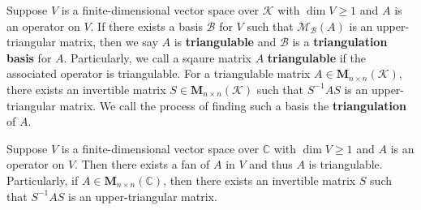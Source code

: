 \documentclass{ctexart}
\newcommand{\M}{\mathbf{M}}
\newcommand{\C}{\mathbb{C}}
\begin{document}
    \begin{mydef}
        Suppose $V$ is a finite-dimensional vector space over $\mathcal K$ with $\dim V\ge 1$ and $A$ is an operator on $V$. If there exists a basis $\mathcal{B}$ for $V$ such that $\mathcal M_\mathcal{B}(A)$ is an upper-triangular matrix, then we say $A$ is \textbf{triangulable} and $\mathcal{B}$ is a \textbf{triangulation basis} for $A$. Particularly, we call a sqaure matrix $A$ \textbf{triangulable} if the associated operator is triangulable. For a triangulable matrix $A\in \M_{n\times n}(\mathcal K)$, there exists an invertible matrix $S \in \M_{n\times n}(\mathcal K)$ such that $S^{-1} A S$ is an upper-triangular matrix. We call the process of finding such a basis the \textbf{triangulation} of $A$.
    \end{mydef}
    \begin{mythm}
        Suppose $V$ is a finite-dimensional vector space over $\C$ with $\dim V\ge 1$ and $A$ is an operator on $V$. Then there exists a fan of $A$ in $V$ and thus $A$ is triangulable. Particularly, if $A\in \M_{n\times n}(\C)$, then there exists an invertible matrix $S$ such that $S^{-1} A S$ is an upper-triangular matrix.
    \end{mythm}
\end{document}
